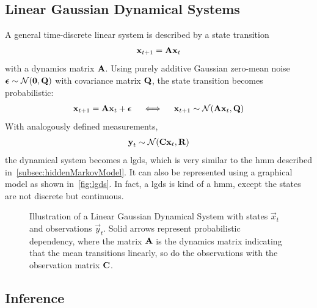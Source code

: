 		\subsection{Linear Gaussian Dynamical Systems}
			A general time-discrete linear system is described by a state transition
			\begin{align*}
				\boldsymbol{\mathrm{x}}_{t + 1} = \boldsymbol{\mathrm{A}} \boldsymbol{\mathrm{x}}_t
			\end{align*}
			with a dynamics matrix \(\boldsymbol{\mathrm{A}}\). Using purely additive Gaussian zero-mean noise \( \boldsymbol{\mathrm{\epsilon}} \sim \mathcal{N}(\boldsymbol{\mathrm{0}}, \boldsymbol{\mathrm{Q}}) \) with covariance matrix \( \boldsymbol{\mathrm{Q}} \), the state transition becomes probabilistic:
			\begin{align*}
				\boldsymbol{\mathrm{x}}_{t + 1} = \boldsymbol{\mathrm{A}} \boldsymbol{\mathrm{x}}_t + \boldsymbol{\mathrm{\epsilon}} \quad\iff\quad \boldsymbol{\mathrm{x}}_{t + 1} \sim \mathcal{N}(\boldsymbol{\mathrm{A}} \boldsymbol{\mathrm{x}}_t, \boldsymbol{\mathrm{Q}})
			\end{align*}
			With analogously defined measurements,
			\begin{align*}
				\boldsymbol{\mathrm{y}}_t \sim \mathcal{N}(\boldsymbol{\mathrm{C}} \boldsymbol{\mathrm{x}}_t, \boldsymbol{\mathrm{R}})
			\end{align*}
			the dynamical system becomes a \ac{lgds}, which is very similar to the \ac{hmm} described in~\autoref{subsec:hiddenMarkovModel}. It can also be represented using a graphical model as shown in~\autoref{fig:lgds}. In fact, a \ac{lgds} is kind of a \ac{hmm}, except the states are not discrete but continuous.

			\begin{figure}
				\centering
				\tikzLinearGaussianDynamicalSystem
				\caption{Illustration of a Linear Gaussian Dynamical System with states \(\vec{x}_t\) and observations \(\vec{y}_t\). Solid arrows represent probabilistic dependency, where the matrix \(\boldsymbol{\mathrm{A}}\) is the dynamics matrix indicating that the mean transitions linearly, so do the observations with the observation matrix \(\boldsymbol{\mathrm{C}}\).}
				\label{fig:lgds}
			\end{figure}

		\subsection{Inference}


